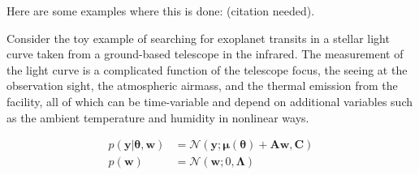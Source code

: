 \documentclass[modern]{rnaastex}
\newcommand{\bvec}[1]{{\ensuremath{\boldsymbol{#1}}}}
\newcommand{\citeme}{{\color{red}(citation needed)}}
\newcommand{\Normal}{\ensuremath{\mathcal{N}}}
\newcommand{\mA}{\ensuremath{\bvec{A}}}
\newcommand{\mC}{\ensuremath{\bvec{C}}}
\newcommand{\mL}{\ensuremath{\bvec{\Lambda}}}
\newcommand{\vw}{\ensuremath{\bvec{w}}}
\newcommand{\vy}{\ensuremath{\bvec{y}}}
\newcommand{\vt}{\ensuremath{\bvec{\theta}}}
\newcommand{\vm}{\ensuremath{\bvec{\mu}(\bvec{\theta})}}
\begin{document}
Here are some examples where this is done: \citeme.
\citep{Luger:2017,Luger:2016}

Consider the toy example of searching for exoplanet transits in a stellar
light curve taken from a ground-based telescope in the infrared.
The measurement of the light curve is a complicated function of the telescope
focus, the seeing at the observation sight, the atmospheric airmass, and the
thermal emission from the facility, all of which can be time-variable and
depend on additional variables such as the ambient temperature and humidity
in nonlinear ways.

\begin{align}
p(\vy | \vt, \vw) &= \Normal(\vy; \vm + \mA \vw, \mC) \nonumber\\
%
p(\vw) &= \Normal(\vw; 0, \mL) \nonumber
\end{align}
\end{document}
